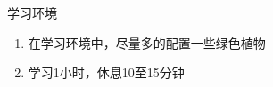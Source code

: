 \documentclass[aspectratio=169]{ctexbeamer} %
\begin{document}
\begin{frame}[t]{学习环境}
\begin{enumerate}[label={\arabic*.}]
\item 在学习环境中，尽量多的配置一些绿色植物
\item 学习1小时，休息10至15分钟
\end{enumerate}
\end{frame}
\end{document}
